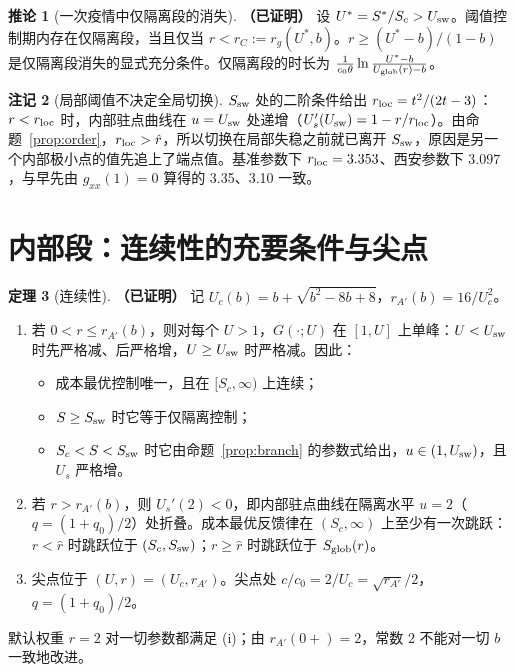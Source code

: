 \documentclass[11pt,a4paper]{ctexart}
\theoremstyle{definition}
\newtheorem{theorem}{定理}[section]
\newtheorem{corollary}[theorem]{推论}
\theoremstyle{definition}
\newtheorem{remark}[theorem]{注记}
\newcommand{\Usw}{U_{\rm sw}}
\newcommand{\Ssw}{S_{\rm sw}}
\newcommand{\rA}{r_{A'}}
\newcommand{\rhat}{\hat r}
\newcommand{\rloc}{r_{\rm loc}}
\newcommand{\Uglob}{U_{\rm glob}}
\newcommand{\proven}{\textbf{（已证明）}}
\begin{document}
\begin{corollary}[一次疫情中仅隔离段的消失]\label{cor:C}\proven
设 $U^*=S^*/S_c>\Usw$。阈值控制期内存在仅隔离段，当且仅当 $r<r_C:=r_g(U^*,b)$。$r\ge(U^*-b)/(1-b)$ 是仅隔离段消失的显式充分条件。仅隔离段的时长为 $\frac{1}{c_0\theta}\ln\frac{U^*-b}{\Uglob(r)-b}$。
\end{corollary}

\begin{remark}[局部阈值不决定全局切换]
$\Ssw$ 处的二阶条件给出 $\rloc=t^2/(2t-3)$：$r<\rloc$ 时，内部驻点曲线在 $u=\Usw$ 处递增（$U_s'(\Usw)=1-r/\rloc$）。由命题~\ref{prop:order}，$\rloc>\rhat$，所以切换在局部失稳之前就已离开 $\Ssw$，原因是另一个内部极小点的值先追上了端点值。基准参数下 $\rloc=3.353$、西安参数下 $3.097$，与早先由 $g_{xx}(1)=0$ 算得的 3.35、3.10 一致。
\end{remark}

\section{内部段：连续性的充要条件与尖点}
\label{sec:interior}

\begin{theorem}[连续性]\label{thm:continuity}\proven
记 $U_c(b)=b+\sqrt{b^2-8b+8}$，$\rA(b)=16/U_c^2$。
\begin{enumerate}[label=(\roman*)]
\item 若 $0<r\le\rA(b)$，则对每个 $U>1$，$G(\cdot;U)$ 在 $[1,U]$ 上单峰：$U<\Usw$ 时先严格减、后严格增，$U\ge\Usw$ 时严格减。因此：
\begin{itemize}
\item 成本最优控制唯一，且在 $[S_c,\infty)$ 上连续；
\item $S\ge\Ssw$ 时它等于仅隔离控制；
\item $S_c<S<\Ssw$ 时它由命题~\ref{prop:branch} 的参数式给出，$u\in(1,\Usw)$，且 $U_s$ 严格增。
\end{itemize}
\item 若 $r>\rA(b)$，则 $U_s'(2)<0$，即内部驻点曲线在隔离水平 $u=2$（$q=(1+q_0)/2$）处折叠。成本最优反馈律在 $(S_c,\infty)$ 上至少有一次跳跃：$r<\rhat$ 时跳跃位于 $(S_c,\Ssw)$；$r\ge\rhat$ 时跳跃位于 $S_{\rm glob}(r)$。
\item 尖点位于 $(U,r)=(U_c,\rA)$。尖点处 $c/c_0=2/U_c=\sqrt{\rA}/2$，$q=(1+q_0)/2$。
\end{enumerate}
默认权重 $r=2$ 对一切参数都满足 (i)；由 $\rA(0+)=2$，常数 $2$ 不能对一切 $b$ 一致地改进。
\end{theorem}
\end{document}

